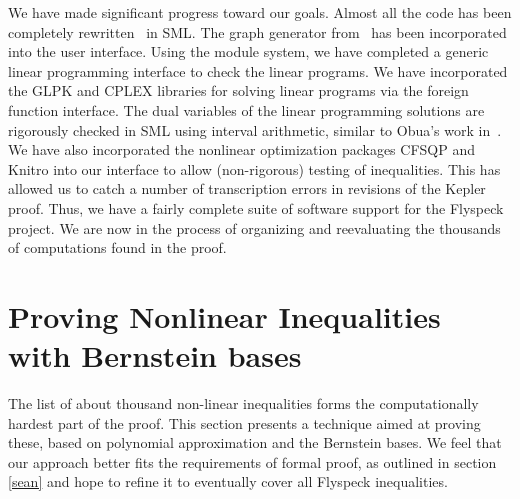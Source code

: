 \documentclass[11pt]{amsart}
\begin{document}
We have made significant progress toward our goals. Almost all the
code has been completely rewritten~\cite{McLaughlin:2008:KeplerCode} in
SML. The graph generator
from~\cite{Nipkow:2005:Tame} has been incorporated into the user
interface. Using the module system, we have completed a generic linear
programming interface to check the linear programs. We have
incorporated the GLPK and CPLEX libraries for solving linear programs
via the foreign function interface. The dual variables of the linear
programming solutions are rigorously checked in SML using interval
arithmetic, similar to Obua's work in~\cite{Obua:2005:Thesis}. We have
also incorporated the nonlinear optimization packages CFSQP and Knitro
into our interface to allow (non-rigorous) testing of inequalities.
This has allowed us to catch a number of transcription errors in
revisions of the Kepler proof. Thus, we have a fairly complete suite
of software support for the Flyspeck project. We are now in the
process of organizing and reevaluating the thousands of computations
found in the proof.




\section{Proving Nonlinear Inequalities with Bernstein bases}
\label{sec:zumkeller}

The list of about thousand non-linear inequalities forms the computationally
hardest part of the proof. This section presents a technique aimed at proving
these, based on polynomial approximation and the Bernstein bases. We feel that
our approach better fits the requirements of formal proof, as outlined in
section \ref{sean} and hope to refine it to eventually cover all Flyspeck
inequalities.
\end{document}
